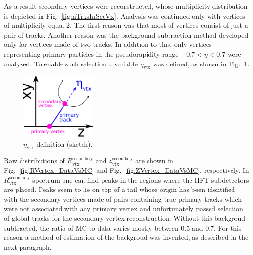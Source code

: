 As a result secondary vertices were reconstructed, whose multiplicity distribution is depicted in Fig.~\ref{fig:nTrksInSecVx}. Analysis was continued only with vertices of multiplicity equal 2. The first reason was that most of vertices consist of just a pair of tracks. Another reason was the background subtraction method developed only for vertices made of two tracks. In addition to this, only vertices representing primary particles in the pseudorapidity range $-0.7 < \eta < 0.7$ were analyzed. To enable such selection a variable $\eta_{\text{vtx}}$ was defined, as shown in Fig.~\ref{fig:etaVxCut}.
\begin{figure}\vspace*{10pt}
  \centering
  \includegraphics[width=0.335\textwidth]{graphics/deadMaterial/etaVxCut2.pdf}\vspace*{-5pt}
  \caption[$\eta_{\text{vtx}}$ definition (sketch).]{$\eta_{\text{vtx}}$ definition (sketch).}%
   \label{fig:etaVxCut}\vspace*{-12pt}
\end{figure}%

Raw distributions of $R_{\text{vtx}}^{\text{secondary}}$ and $z_{\text{vtx}}^{\text{secondary}}$ are shown in Fig.~\ref{fig:RVertex_DataVsMC} and Fig.~\ref{fig:ZVertex_DataVsMC}, respectively. In $R_{\text{vtx}}^{\text{secondary}}$ spectrum one can find peaks in the regions where the HFT subdetectors are placed. Peaks seem to lie on top of a tail whose origin has been identified with the secondary vertices made of pairs containing true primary tracks which were not associated with any primary vertex and unfortunately passed selection of global tracks for the secondary vertex reconstruction. Without this backgroud subtracted, the ratio of MC to data varies mostly between 0.5 and 0.7. For this reason a method of estimation of the backgroud was invented, as described in the next paragraph.


